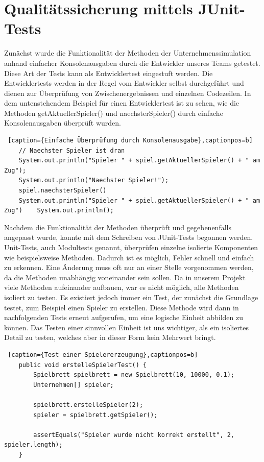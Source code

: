 \clearpage
\chapter{Qualitätssicherung mittels JUnit-Tests}

Zunächst wurde die Funktionalität der Methoden der Unternehmenssimulation anhand einfacher Konsolenausgaben durch die Entwickler unseres Teams getestet. Diese Art der Tests kann als Entwicklertest eingestuft werden. Die Entwicklertests werden in der Regel vom Entwickler selbst durchgeführt und dienen zur Überprüfung von Zwischenergebnissen und einzelnen Codezeilen. In dem untenstehendem Beispiel für einen Entwicklertest ist zu sehen, wie die Methoden getAktuellerSpieler() und naechsterSpieler() durch einfache Konsolenausgaben überprüft wurden.

\lstset{language=Java}
\begin{lstlisting} [caption={Einfache Überprüfung durch Konsolenausgabe},captionpos=b]
	// Naechster Spieler ist dran 
	System.out.println("Spieler " + spiel.getAktuellerSpieler() + " am Zug");
	System.out.println("Naechster Spieler!");
	spiel.naechsterSpieler()	
	System.out.println("Spieler " + spiel.getAktuellerSpieler() + " am Zug")	System.out.println();
\end{lstlisting}

Nachdem die Funktionalität der Methoden überprüft und gegebenenfalls angepasst wurde, konnte mit dem Schreiben von JUnit-Tests begonnen werden. Unit-Tests, auch Modultests genannt, überprüfen einzelne isolierte Komponenten wie beispielsweise Methoden. Dadurch ist es möglich, Fehler schnell und einfach zu erkennen. Eine Änderung muss oft nur an einer Stelle vorgenommen werden, da die Methoden unabhängig voneinander sein sollen. Da in unserem Projekt viele Methoden aufeinander aufbauen, war es nicht möglich, alle Methoden isoliert zu testen. Es existiert jedoch immer ein Test, der zunächst die Grundlage testet, zum Beispiel einen Spieler zu erstellen. Diese Methode wird dann in nachfolgenden Tests erneut aufgerufen, um eine logische Einheit abbilden zu können. Das Testen einer sinnvollen Einheit ist uns wichtiger, als ein isoliertes Detail zu testen, welches aber in dieser Form kein Mehrwert bringt.

\lstset{language=Java}
\begin{lstlisting} [caption={Test einer Spielererzeugung},captionpos=b]
	public void erstelleSpielerTest() {
		Spielbrett spielbrett = new Spielbrett(10, 10000, 0.1);
		Unternehmen[] spieler;
		
		spielbrett.erstelleSpieler(2);
		spieler = spielbrett.getSpieler();
		
		assertEquals("Spieler wurde nicht korrekt erstellt", 2, spieler.length);
	}
\end{lstlisting}

